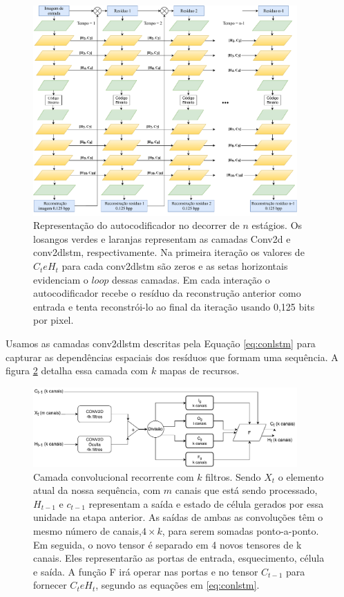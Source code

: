 \begin{figure}
	\centering
	\includegraphics[width=0.90\textwidth]{figuras/redeTCC.pdf}
	\caption[Autocodificador desenrolado no tempo]{Representação do autocodificador no decorrer de $n$ estágios. Os losangos verdes e laranjas representam as camadas Conv2d e \acrshort{conv2dlstm}, respectivamente.  Na primeira iteração os valores de $C_t e H_t$ para cada \acrshort{conv2dlstm} são zeros e as setas horizontais evidenciam o $loop$ dessas camadas. Em cada interação o autocodificador recebe o resíduo da reconstrução anterior como entrada e tenta reconstrói-lo ao final da iteração usando 0,125 bits por pixel.}
	\label{fig:rede_toderici}
\end{figure}

Usamos as camadas \acrshort{conv2dlstm} descritas pela Equação \ref{eq:conlstm} para capturar as dependências espaciais dos resíduos que formam uma sequência. A figura \ref{fig:convlstm} detalha essa camada com $k$ mapas de recursos. 

\begin{figure}[ht]
	\centering
	\includegraphics[width=0.90\textwidth]{figuras/convlstm.pdf}
	\caption[Conv2DLSTM]{Camada convolucional recorrente com $k$ filtros. Sendo $X_t$ o elemento atual da nossa sequência, com $m$ canais que está sendo processado, $H_{t-1}$ e $c_{t-1}$ representam a saída e estado de célula gerados por essa unidade na etapa anterior. As saídas de ambas as convoluções têm o mesmo número de canais,$4\times k$, para serem somadas ponto-a-ponto. Em seguida, o novo tensor é separado em 4 novos tensores de k canais. Eles representarão as portas de entrada, esquecimento, célula e saída. A função F irá operar nas portas e no tensor $C_{t-1}$ para fornecer $C_t e H_t$, segundo as equações em \ref{eq:conlstm}.}
	\label{fig:convlstm}
\end{figure}

